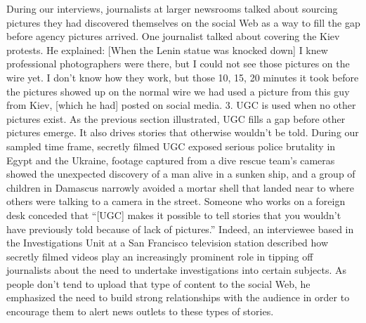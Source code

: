 \begin{enumerate}
During our interviews, journalists at larger newsrooms talked about sourcing
pictures they had discovered themselves on the social Web as a way to
fill the gap before agency pictures arrived. One journalist talked about covering
the Kiev protests. He explained:
[When the Lenin statue was knocked down] I knew professional
photographers were there, but I could not see those pictures on the
wire yet. I don't know how they work, but those 10, 15, 20 minutes
it took before the pictures showed up on the normal wire we had
used a picture from this guy from Kiev, [which he had] posted on
social media.
3. UGC is used when no other pictures exist.
As the previous section illustrated, UGC fills a gap before other pictures
emerge. It also drives stories that otherwise wouldn't be told. During our
sampled time frame, secretly filmed UGC exposed serious police brutality
in Egypt and the Ukraine, footage captured from a dive rescue team's cameras
showed the unexpected discovery of a man alive in a sunken ship, and a
group of children in Damascus narrowly avoided a mortar shell that landed
near to where others were talking to a camera in the street.
Someone who works on a foreign desk conceded that ``[UGC] makes it possible
to tell stories that you wouldn't have previously told because of lack
of pictures.'' Indeed, an interviewee based in the Investigations Unit at a
San Francisco television station described how secretly filmed videos play
an increasingly prominent role in tipping off journalists about the need
to undertake investigations into certain subjects. As people don't tend to
upload that type of content to the social Web, he emphasized the need to
build strong relationships with the audience in order to encourage them to
alert news outlets to these types of stories.


\end{enumerate}
